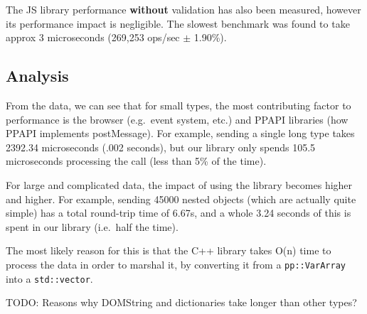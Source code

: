 The JS library performance \textbf{without} validation has also been
measured, however its performance impact is negligible. The slowest
benchmark was found to take approx 3 microseconds (269,253 ops/sec
$\pm$  1.90\%).

\subsection{Analysis}\label{analysis}

From the data, we can see that for small types, the most contributing
factor to performance is the browser (e.g.~event system, etc.) and PPAPI
libraries (how PPAPI implements postMessage). For example, sending a
single long type takes 2392.34 microseconds (.002 seconds), but our
library only spends 105.5 microseconds processing the call (less than
5\% of the time).

For large and complicated data, the impact of using the library becomes
higher and higher. For example, sending 45000 nested objects (which are
actually quite simple) has a total round-trip time of 6.67s, and a whole
3.24 seconds of this is spent in our library (i.e.~half the time).

The most likely reason for this is that the C++ library takes O(n) time to process the data in order to marshal it, by converting it from a \lstinline{pp::VarArray} into a \lstinline{std::vector}.

TODO: Reasons why DOMString and dictionaries take longer than other types?

